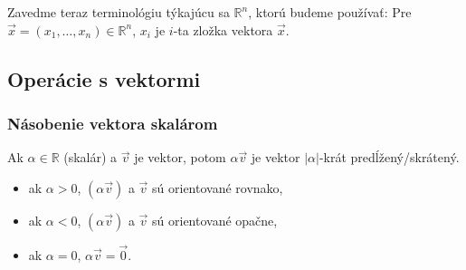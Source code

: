 \documentclass[11pt]{article}
\renewcommand{\vec}[1]{\overrightarrow{#1}}
\newcommand{\R}{\mathbb{R}}
\begin{document}
Zavedme teraz terminológiu týkajúcu sa $\R^n$, ktorú budeme používať:
Pre $\vec{x}=(x_1, \dots, x_n) \in \R^n$, $x_i$ je $i$-ta zložka vektora $\vec{x}$.

\hrulefill

\subsection{Operácie s vektormi}

\subsubsection{Násobenie vektora skalárom}
\begin{definition}
Ak $\alpha \in \R$ (skalár) a $\vec{v}$ je vektor, potom $\alpha\vec{v}$ je vektor $|\alpha|$-krát predĺžený/skrátený.
\begin{itemize}
    \item ak $\alpha > 0$, $(\alpha\vec{v})$ a $\vec{v}$ sú orientované rovnako,
    \item ak $\alpha < 0$, $(\alpha\vec{v})$ a $\vec{v}$ sú orientované opačne,
    \item ak $\alpha=0$, $\alpha\vec{v} = \vec{0}$.
\end{itemize}
\end{definition}
\begin{center}
\end{center}
\end{document}
